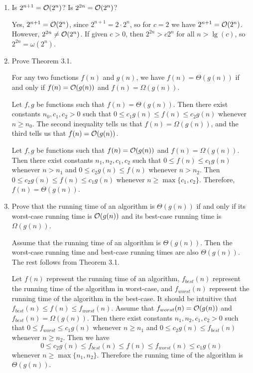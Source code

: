 \documentclass[Chapter03]{subfiles}
\begin{document}
\begin{enumerate}
		\item Is $2^{n + 1} = \mathcal{O}(2^n)$? Is $2^{2n} = \mathcal{O}(2^n)$?
		\begin{answer}
			Yes, $2^{n + 1} = \mathcal{O}(2^n)$, since $2^{n+1} = 2\cdot 2^n$, so for $c = 2$ we have $2^{n + 1} = \mathcal{O}(2^n)$. However, $2^{2n} \neq \mathcal{O}(2^n)$. If given $c > 0$, then $2^{2n} > c2^n$ for all $n > \lg(c)$, so $2^{2n} = \omega(2^n)$.
		\end{answer}

		\item Prove Theorem 3.1.
		\begin{theorem}[Theorem 3.1]
			For any two functions $f(n)$ and $g(n)$, we have $f(n) = \Theta(g(n))$ if and only if $f(n) = \mathcal{O}(g(n))$ and $f(n) = \Omega(g(n))$.
		\end{theorem}
		\begin{answer}
			\boxed{\implies} Let $f,g$ be functions such that $f(n) = \Theta(g(n))$. Then there exist constants $n_0,c_1,c_2 > 0$ such that $0 \leq c_1g(n) \leq f(n) \leq c_2g(n)$ whenever $n \geq n_0$. The second inequality tells us that $f(n) = \Omega(g(n))$, and the third tells us that $f(n) = \mathcal{O}(g(n))$.

			\boxed{\impliedby} Let $f,g$ be functions such that $f(n) = \mathcal{O}(g(n))$ and $f(n) = \Omega(g(n))$. Then there exist constants $n_1,n_2,c_1,c_2$ such that $0 \leq f(n) \leq c_1g(n)$ whenever $n > n_1$ and $0 \leq c_2g(n) \leq f(n)$ whenever $n > n_2$. Then $0 \leq c_2g(n) \leq f(n) \leq c_1g(n)$ whenever $n \geq \max\{c_1,c_2\}$. Therefore, $f(n) = \Theta(g(n))$.
		\end{answer}

		\item Prove that the running time of an algorithm is $\Theta(g(n))$ if and only if its worst-case running time is $\mathcal{O}(g(n))$ and its best-case running time is $\Omega(g(n))$.
		\begin{answer}
			\boxed{\implies} Assume that the running time of an algorithm is $\Theta(g(n))$. Then the worst-case running time and best-case running times are also $\Theta(g(n))$. The rest follows from Theorem 3.1.

			\boxed{\impliedby} Let $f(n)$ represent the running time of an algorithm, $f_{best}(n)$ represent the running time of the algorithm in worst-case, and $f_{worst}(n)$ represent the running time of the algorithm in the best-case. It should be intuitive that $f_{best}(n) \leq f(n) \leq f_{worst}(n)$. Assume that $f_{worst}(n) = \mathcal{O}(g(n))$ and $f_{best}(n) = \Omega(g(n))$. Then there exist constants $n_1,n_2,c_1,c_2 > 0$ such that $0 \leq f_{worst} \leq c_1g(n)$ whenever $n \geq n_1$ and $0 \leq c_2g(n) \leq f_{best}(n)$ whenever $n \geq n_2$. Then we have
			\[
				0 \leq c_2g(n) \leq f_{best}(n) \leq f(n) \leq f_{worst}(n) \leq c_1g(n)
			\]
			whenever $n \geq \max\{n_1,n_2\}$. Therefore the running time of the algorithm is $\Theta(g(n))$.
		\end{answer}


\end{enumerate}
\end{document}
